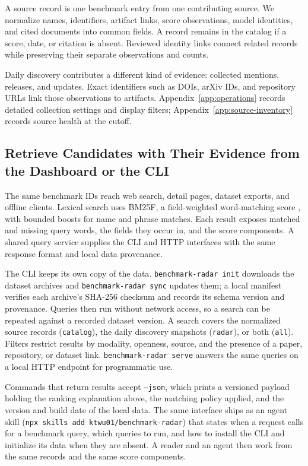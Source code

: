 \documentclass[11pt]{article}
\begin{document}
A source record is one benchmark entry from one contributing source. We normalize names, identifiers, artifact links, score observations, model identities, and cited documents into common fields. A record remains in the catalog if a score, date, or citation is absent. Reviewed identity links connect related records while preserving their separate observations and counts.

Daily discovery contributes a different kind of evidence: collected mentions, releases, and updates. Exact identifiers such as DOIs, arXiv IDs, and repository URLs link those observations to artifacts. Appendix~\ref{app:operations} records detailed collection settings and display filters; Appendix~\ref{app:source-inventory} records source health at the cutoff.

\subsection{Retrieve Candidates with Their Evidence from the Dashboard or the CLI}

The same benchmark IDs reach web search, detail pages, dataset exports, and offline clients. Lexical search uses BM25F, a field-weighted word-matching score \citep{robertson2004bm25f}, with bounded boosts for name and phrase matches. Each result exposes matched and missing query words, the fields they occur in, and the score components. A shared query service supplies the CLI and HTTP interfaces with the same response format and local data provenance.

The CLI keeps its own copy of the data. \texttt{benchmark-radar init} downloads the dataset archives and \texttt{benchmark-radar sync} updates them; a local manifest verifies each archive's SHA-256 checksum and records its schema version and provenance. Queries then run without network access, so a search can be repeated against a recorded dataset version. A search covers the normalized source records (\texttt{catalog}), the daily discovery snapshots (\texttt{radar}), or both (\texttt{all}). Filters restrict results by modality, openness, source, and the presence of a paper, repository, or dataset link. \texttt{benchmark-radar serve} answers the same queries on a local HTTP endpoint for programmatic use.

Commands that return results accept \texttt{--json}, which prints a versioned payload holding the ranking explanation above, the matching policy applied, and the version and build date of the local data. The same interface ships as an agent skill (\texttt{npx skills add ktwu01/benchmark-radar}) that states when a request calls for a benchmark query, which queries to run, and how to install the CLI and initialize its data when they are absent. A reader and an agent then work from the same records and the same score components.
\end{document}
